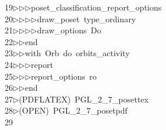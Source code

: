 \begin{tabbing}
19\>$\triangleright$\>$\triangleright$\>$\triangleright$\>poset\_classification\_report\_options\ \\[0pt]
20\>$\triangleright$\>$\triangleright$\>$\triangleright$\>$\triangleright$\>draw\_poset\ type\_ordinary\ \\[0pt]
21\>$\triangleright$\>$\triangleright$\>$\triangleright$\>$\triangleright$\>draw\_options\ Do\ \\[0pt]
22\>$\triangleright$\>$\triangleright$\>end\ \\[0pt]
23\>$\triangleright$\>$\triangleright$\>with\ Orb\ do\ orbits\_activity\ \\[0pt]
24\>$\triangleright$\>$\triangleright$\>$\triangleright$\>report\ \ \\[0pt]
25\>$\triangleright$\>$\triangleright$\>$\triangleright$\>report\_options\ ro\ \\[0pt]
26\>$\triangleright$\>$\triangleright$\>end\ \\[0pt]
27\>$\triangleright$\>(PDFLATEX)\ PGL\_2\_7\_posettex\\[0pt]
28\>$\triangleright$\>(OPEN)\ PGL\_2\_7\_posetpdf\\[0pt]
29\>\end{tabbing}
